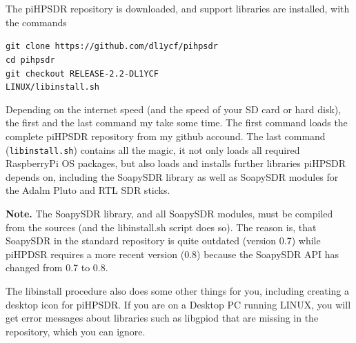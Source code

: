 \documentclass[12pt]{book}
\def\grtt#1{\texttt{\color{magenta}#1}}
\begin{document}
The piHPSDR repository is downloaded, and support libraries are installed, with the commands

\grtt{git clone https://github.com/dl1ycf/pihpsdr} \\
\grtt{cd pihpsdr} \\
\grtt{git checkout RELEASE-2.2-DL1YCF} \\
\grtt{LINUX/libinstall.sh} \\

\begin{center}
\end{center}

Depending on the internet speed (and the speed of your SD card or hard disk), the first and the
last command my take some time. The first command loads the complete piHPSDR repository from
my github accound. The last command (\texttt{libinstall.sh}) contains all the magic,
it not only loads all required RaspberryPi OS packages,
but also loads and installs further libraries piHPSDR depends on, 
including the SoapySDR library as well as SoapySDR modules for the Adalm Pluto and RTL SDR sticks.

\textbf{Note.} The SoapySDR library, and all SoapySDR modules, must be compiled from the sources
(and the libinstall.sh script does so). The reason is, that SoapySDR in the standard repository
is quite outdated (version 0.7) while piHPDSR requires a more recent version (0.8) because the
SoapySDR API has changed from 0.7 to 0.8.

The libinstall procedure also does some other things for you, including creating a desktop icon
for piHPSDR. If you are on a Desktop PC running LINUX, you will get error messages about
libraries such as libgpiod that are missing in the repository, which you can ignore.
\end{document}
